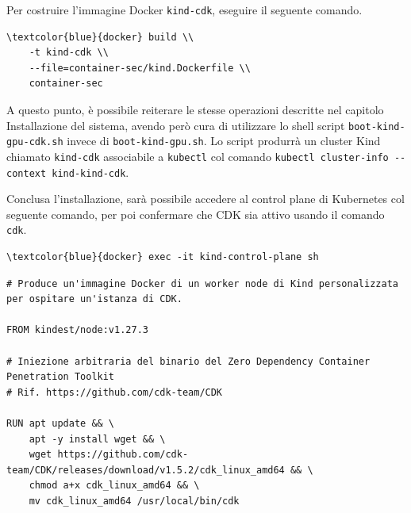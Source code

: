 Per costruire l'immagine Docker {\small \verb|kind-cdk|}, eseguire il seguente comando.

\begin{small}
\begin{Verbatim}[commandchars=\\\{\}]
\textcolor{blue}{docker} build \\
    -t kind-cdk \\
    --file=container-sec/kind.Dockerfile \\
    container-sec
\end{Verbatim}
\end{small}

A questo punto, è possibile reiterare le stesse operazioni descritte nel capitolo Installazione del sistema, avendo però cura di utilizzare lo shell script {\small \verb|boot-kind-gpu-cdk.sh|} invece di {\small \verb|boot-kind-gpu.sh|}. Lo script produrrà un cluster Kind chiamato {\small \verb|kind-cdk|} associabile a {\small \verb|kubectl|} col comando {\small \verb|kubectl cluster-info --context kind-kind-cdk|}.

Conclusa l'installazione, sarà possibile accedere al control plane di Kubernetes col seguente comando, per poi confermare che CDK sia attivo usando il comando {\small \verb|cdk|}.

\begin{small}
\begin{Verbatim}[commandchars=\\\{\}]
\textcolor{blue}{docker} exec -it kind-control-plane sh
\end{Verbatim}
\end{small}

\begin{code}
\label{code:apx:a:dockerfile}
\begin{verbatim}
# Produce un'immagine Docker di un worker node di Kind personalizzata per ospitare un'istanza di CDK.

FROM kindest/node:v1.27.3

# Iniezione arbitraria del binario del Zero Dependency Container Penetration Toolkit
# Rif. https://github.com/cdk-team/CDK

RUN apt update && \
    apt -y install wget && \
    wget https://github.com/cdk-team/CDK/releases/download/v1.5.2/cdk_linux_amd64 && \
    chmod a+x cdk_linux_amd64 && \
    mv cdk_linux_amd64 /usr/local/bin/cdk
\end{verbatim}
\end{code}

